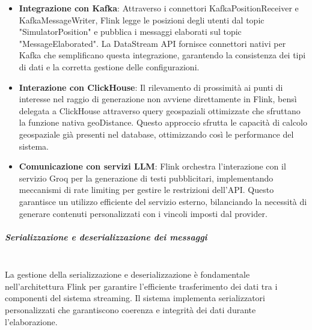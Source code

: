 \documentclass[10pt]{article}
\newcommand{\mysubparagraph}[1]{\subparagraph{#1}\mbox{}\\}
\begin{document}
        \begin{itemize}
            \item \textbf{Integrazione con Kafka}: Attraverso i connettori KafkaPositionReceiver e KafkaMessageWriter, Flink legge le posizioni degli utenti dal topic "SimulatorPosition" e pubblica i messaggi elaborati sul topic "MessageElaborated". La DataStream API fornisce connettori nativi per Kafka che semplificano questa integrazione, garantendo la consistenza dei tipi di dati e la corretta gestione delle configurazioni.

            \item \textbf{Interazione con ClickHouse}: Il rilevamento di prossimità ai punti di interesse nel raggio di generazione non avviene direttamente in Flink, bensì delegata a ClickHouse attraverso query geospaziali ottimizzate che sfruttano la funzione nativa geoDistance. Questo approccio sfrutta le capacità di calcolo geospaziale già presenti nel database, ottimizzando così le performance del sistema.

            \item \textbf{Comunicazione con servizi LLM}: Flink orchestra l'interazione con il servizio Groq per la generazione di testi pubblicitari, implementando meccanismi di rate limiting per gestire le restrizioni dell'API. Questo garantisce un utilizzo efficiente del servizio esterno, bilanciando la necessità di generare contenuti personalizzati con i vincoli imposti dal provider.
        \end{itemize}

        \mysubparagraph{Serializzazione e deserializzazione dei messaggi}
        La gestione della serializzazione e deserializzazione è fondamentale nell'architettura Flink per garantire l'efficiente trasferimento dei dati tra i componenti del sistema streaming. Il sistema implementa serializzatori personalizzati che garantiscono coerenza e integrità dei dati durante l'elaborazione.
\end{document}
